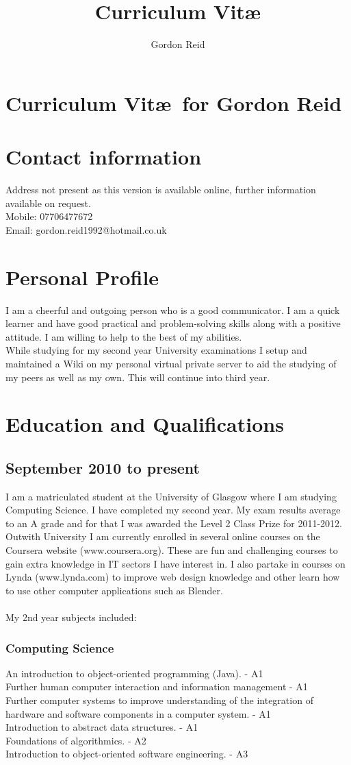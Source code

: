 \documentclass[10pt,a4paper]{article}
\title{Curriculum Vit\ae}
\author{Gordon Reid}
\begin{document}
\section*{Curriculum Vit\ae\ for Gordon Reid}
\section*{Contact information}
Address not present as this version is available online, further information available on request.\\
Mobile: 07706477672\\
Email: gordon.reid1992@hotmail.co.uk
\section*{Personal Profile}
I am a cheerful and outgoing person who is a good communicator. I am a quick learner and have good practical and problem-solving skills along with a positive attitude. I am willing to help to the best of my abilities.\\
While studying for my second year University examinations I setup and maintained a Wiki on my personal virtual private server to aid the studying of my peers as well as my own. This will continue into third year.
\section*{Education and Qualifications}
\subsection*{September 2010 to present}
I am a matriculated student at the University of Glasgow where I am studying Computing Science. I have completed my second year. My exam results average to an A grade and for that I was awarded the Level 2 Class Prize for 2011-2012.\\
Outwith University I am currently enrolled in several online courses on the Coursera website (www.coursera.org). These are fun and challenging courses to gain extra knowledge in IT sectors I have interest in. I also partake in courses on Lynda (www.lynda.com) to improve web design knowledge and other learn how to use other computer applications such as Blender.\\\\
My 2nd year subjects included:
\subsubsection*{Computing Science}
An introduction to object-oriented programming (Java). - A1\\
Further human computer interaction and information management - A1\\
Further computer systems to improve understanding of the integration of hardware and software components in a computer system. - A1\\
Introduction to abstract data structures. - A1\\
Foundations of algorithmics. - A2\\
Introduction to object-oriented software engineering. - A3
\end{document}
